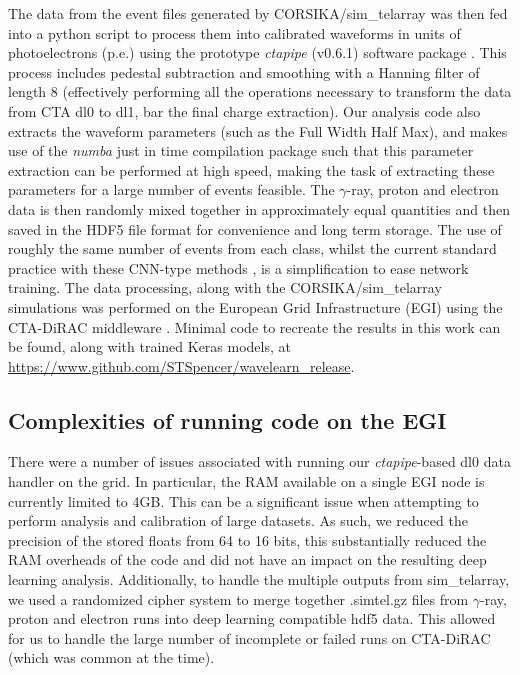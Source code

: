 The data from the event files generated by CORSIKA/sim\_telarray was then fed into a python script to process them into calibrated waveforms in units of photoelectrons (p.e.) using the prototype \textit{ctapipe} (v0.6.1) software package \cite{ctapipe}\cite{ctapipe2}. This process includes pedestal subtraction and smoothing with a Hanning filter \cite{hanning} of length 8 (effectively performing all the operations necessary to transform the data from CTA dl0 to dl1, bar the final charge extraction). Our analysis code also extracts the waveform parameters (such as the Full Width Half Max), and makes use of the \textit{numba} \cite{numba} just in time compilation package such that this parameter extraction can be performed at high speed, making the task of extracting these parameters for a large number of events feasible. The $\gamma$-ray, proton and electron data is then randomly mixed together in approximately equal quantities and then saved in the HDF5 \cite{hdf} file format for convenience and long term storage. The use of roughly the same number of events from each class, whilst the current standard practice with these CNN-type methods \cite{Shilon}, is a simplification to ease network training. The data processing, along with the CORSIKA/sim\_telarray simulations was performed on the European Grid Infrastructure (EGI) using the CTA-DiRAC middleware \cite{luisa}. Minimal code to recreate the results in this work can be found, along with trained Keras models, at \url{https://www.github.com/STSpencer/wavelearn\_release}.

\subsection{Complexities of running code on the EGI}
There were a number of issues associated with running our \textit{ctapipe}-based dl0 data handler on the grid. In particular, the RAM available on a single EGI node is currently limited to 4GB. This can be a significant issue when attempting to perform analysis and calibration of large datasets. As such, we reduced the precision of the stored floats from 64 to 16 bits, this substantially reduced the RAM overheads of the code and did not have an impact on the resulting deep learning analysis. Additionally, to handle the multiple outputs from sim\_telarray, we used a randomized cipher system to merge together .simtel.gz files from $\gamma$-ray, proton and electron runs into deep learning compatible hdf5 data. This allowed for us to handle the large number of incomplete or failed runs on CTA-DiRAC (which was common at the time).

